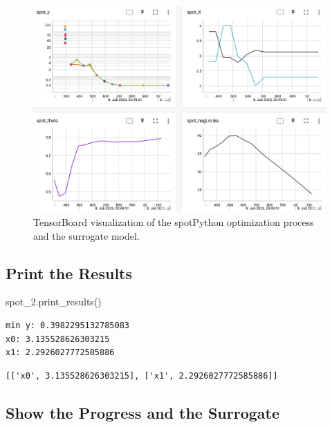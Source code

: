 \documentclass[
  letterpaper,
  DIV=11,
  numbers=noendperiod]{scrreprt}
\newenvironment{Shaded}{\begin{snugshade}}{\end{snugshade}}
\newcommand{\NormalTok}[1]{\textcolor[rgb]{0.00,0.23,0.31}{#1}}
\begin{document}
\begin{figure}

{\centering \includegraphics[width=1\textwidth,height=\textheight]{figures_static/04_tensorboard_01.png}

}

\caption{TensorBoard visualization of the spotPython optimization
process and the surrogate model.}

\end{figure}

\hypertarget{print-the-results-1}{%
\subsection{Print the Results}\label{print-the-results-1}}

\begin{Shaded}
\begin{Highlighting}[]
\NormalTok{spot\_2.print\_results()}
\end{Highlighting}
\end{Shaded}

\begin{verbatim}
min y: 0.3982295132785083
x0: 3.135528626303215
x1: 2.2926027772585886
\end{verbatim}

\begin{verbatim}
[['x0', 3.135528626303215], ['x1', 2.2926027772585886]]
\end{verbatim}

\hypertarget{show-the-progress-and-the-surrogate}{%
\subsection{Show the Progress and the
Surrogate}\label{show-the-progress-and-the-surrogate}}
\end{document}
